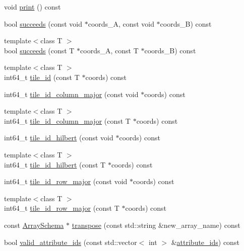 \begin{DoxyCompactItemize}
void \hyperlink{classArraySchema_a0d8183f223c0b9923f0cc32343afb82b}{print} () const 
\item 
bool \hyperlink{classArraySchema_a2258f23c08d42bd09ed8c304092c23dd}{succeeds} (const void $\ast$coords\+\_\+\+A, const void $\ast$coords\+\_\+\+B) const 
\item 
{\footnotesize template$<$class T $>$ }\\bool \hyperlink{classArraySchema_a686f22a15845677896374031fbb5a6e7}{succeeds} (const T $\ast$coords\+\_\+\+A, const T $\ast$coords\+\_\+\+B) const 
\item 
{\footnotesize template$<$class T $>$ }\\int64\+\_\+t \hyperlink{classArraySchema_ad417ff1697d082cef46f45264883ddc2}{tile\+\_\+id} (const T $\ast$coords) const 
\item 
int64\+\_\+t \hyperlink{classArraySchema_a0f329fc507ecfadf52d68836f99f1725}{tile\+\_\+id\+\_\+column\+\_\+major} (const void $\ast$coords) const 
\item 
{\footnotesize template$<$class T $>$ }\\int64\+\_\+t \hyperlink{classArraySchema_a347a8b6503bacf73382795a022526920}{tile\+\_\+id\+\_\+column\+\_\+major} (const T $\ast$coords) const 
\item 
int64\+\_\+t \hyperlink{classArraySchema_a5a35cd5e58d02ac3869a76f3a43350af}{tile\+\_\+id\+\_\+hilbert} (const void $\ast$coords) const 
\item 
{\footnotesize template$<$class T $>$ }\\int64\+\_\+t \hyperlink{classArraySchema_ad10a91ec3f072da4c7afc180ef7318f0}{tile\+\_\+id\+\_\+hilbert} (const T $\ast$coords) const 
\item 
int64\+\_\+t \hyperlink{classArraySchema_ab6ff89f2c110d474a47f0e628c0370e8}{tile\+\_\+id\+\_\+row\+\_\+major} (const void $\ast$coords) const 
\item 
{\footnotesize template$<$class T $>$ }\\int64\+\_\+t \hyperlink{classArraySchema_ac381a88d55c7ca77fb63b007621b840e}{tile\+\_\+id\+\_\+row\+\_\+major} (const T $\ast$coords) const 
\item 
const \hyperlink{classArraySchema}{Array\+Schema} $\ast$ \hyperlink{classArraySchema_a1221f4df6ca43c61302c471c8166ca74}{transpose} (const std\+::string \&new\+\_\+array\+\_\+name) const 
\item 
bool \hyperlink{classArraySchema_a0963db954049ddfd8e574b575d9b3df0}{valid\+\_\+attribute\+\_\+ids} (const std\+::vector$<$ int $>$ \&\hyperlink{classArraySchema_a61357e5839af6acefcc7be9ef1a3b300}{attribute\+\_\+ids}) const 
\end{DoxyCompactItemize}
